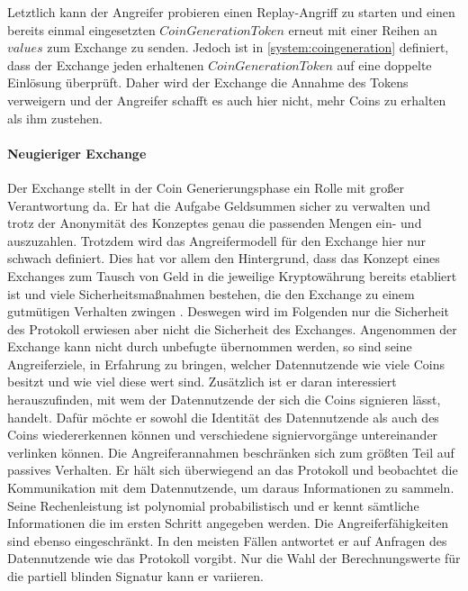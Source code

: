 \documentclass{scrreprt}
\begin{document}
Letztlich kann der Angreifer probieren einen Replay-Angriff zu starten und einen bereits einmal eingesetzten $CoinGenerationToken$ erneut mit einer Reihen an $values$ zum Exchange zu senden. Jedoch ist in \ref{system:coingeneration} definiert, dass der Exchange jeden erhaltenen $CoinGenerationToken$ auf eine doppelte Einlösung überprüft. Daher wird der Exchange die Annahme des Tokens verweigern und der Angreifer schafft es auch hier nicht, mehr Coins zu erhalten als ihm zustehen.\\

\paragraph{Neugieriger Exchange}
Der Exchange stellt in der Coin Generierungsphase ein Rolle mit großer Verantwortung da. Er hat die Aufgabe Geldsummen sicher zu verwalten und trotz der Anonymität des Konzeptes genau die passenden Mengen ein- und auszuzahlen. Trotzdem wird das Angreifermodell für den Exchange hier nur schwach definiert. Dies hat vor allem den Hintergrund, dass das Konzept eines Exchanges zum Tausch von Geld in die jeweilige Kryptowährung bereits etabliert ist und viele Sicherheitsmaßnahmen bestehen, die den Exchange zu einem gutmütigen Verhalten zwingen \cite{gnu-burdges2016enabling}\cite{kim2018risk}\cite{baum2021p2dex}. Deswegen wird im Folgenden nur die Sicherheit des Protokoll erwiesen aber nicht die Sicherheit des Exchanges.
Angenommen der Exchange kann nicht durch unbefugte übernommen werden, so sind seine Angreiferziele, in Erfahrung zu bringen, welcher Datennutzende wie viele Coins besitzt und wie viel diese wert sind.  Zusätzlich ist er daran interessiert herauszufinden, mit wem der Datennutzende der sich die Coins signieren lässt, handelt. Dafür möchte er sowohl die Identität des Datennutzende als auch des Coins wiedererkennen können und verschiedene signiervorgänge untereinander verlinken können. Die Angreiferannahmen beschränken sich zum größten Teil auf passives Verhalten. Er hält sich überwiegend an das Protokoll und beobachtet die Kommunikation mit dem Datennutzende, um daraus Informationen zu sammeln. Seine Rechenleistung ist polynomial probabilistisch und er kennt sämtliche Informationen die im ersten Schritt angegeben werden. Die Angreiferfähigkeiten sind ebenso eingeschränkt. In den meisten Fällen antwortet er auf Anfragen des Datennutzende wie das Protokoll vorgibt. Nur die Wahl der Berechnungswerte für die partiell blinden Signatur kann er variieren.\\
\end{document}
